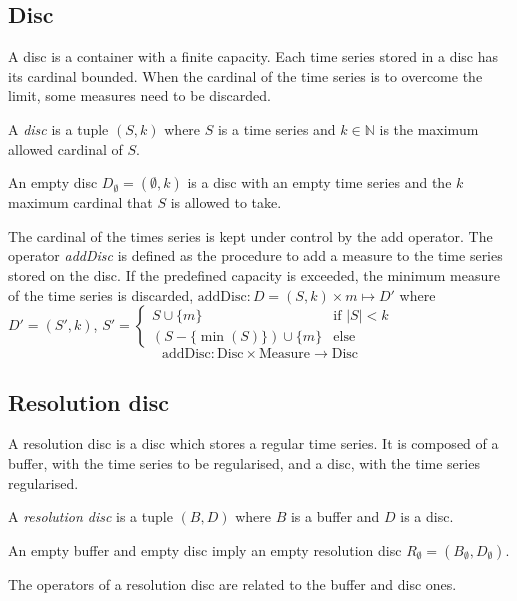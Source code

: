 \subsection{Disc}\label{sec:model:disc}

A disc is a container with a finite capacity. Each time series stored
in a disc has its cardinal bounded. When the cardinal of the time
series is to overcome the limit, some measures need to be discarded.

\begin{definition}[Disc]
  A \emph{disc} is a tuple $(S,k)$ where $S$ is a time
  series and $k\in\mathbb{N}$ is the maximum allowed cardinal of $S$.
\end{definition}

An empty disc $D_{\emptyset} = (\emptyset,k)$ is a disc with an empty
time series and the $k$ maximum cardinal that $S$ is allowed to take.

The cardinal of the times series is kept under control by the add
operator.  The operator \emph{addDisc} is defined as the procedure to
add a measure to the time series stored on the disc. If the predefined
capacity is exceeded, the minimum measure of the time series is
discarded, $\text{addDisc}: D=(S,k) \times m \mapsto D'$ where $ D' =
(S',k)$, $ S' =
  \begin{cases}
      S\cup\{m\} &\text{if }  |S|<k\\
      (S-\{\min(S)\}) \cup \{m\} & \text{else }
    \end{cases}  
    $
  \[
  \text{addDisc}: \text{Disc} \times \text{Measure} \longrightarrow \text{Disc}
  \]



\subsection{Resolution disc}

A resolution disc is a disc which stores a regular time series. It is
composed of a buffer, with the time series to be regularised, and a
disc, with the time series regularised.

\begin{definition}
  A \emph{resolution disc} is a tuple $(B,D)$ where $B$
  is a buffer and $D$ is a disc.
\end{definition}
 
An empty buffer and empty disc imply an empty resolution disc
$R_{\emptyset} = (B_{\emptyset},D_{\emptyset})$.

The operators of a resolution disc are related to
the buffer and disc ones.

